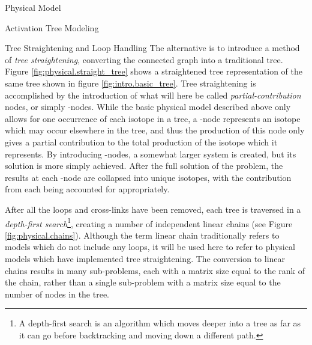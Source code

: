 \begin{chapter}{Physical Model\label{chap:physical}}
\begin{section}{Activation Tree Modeling\label{sec:physical.chains}}
\begin{subsection}{Tree Straightening and Loop Handling}
    The alternative is to introduce a method of \textsl{tree
      straightening}, converting the connected graph into a
    traditional \nary tree.  Figure \ref{fig:physical.straight_tree}
    shows a straightened tree representation of the same tree shown in
    figure \ref{fig:intro.basic_tree}.  Tree straightening is
    accomplished by the introduction of what will here be called
    \textsl{partial-contribution} nodes, or simply \pc-nodes.  While
    the basic physical model described above only allows for one
    occurrence of each isotope in a tree, a \pc-node represents an
    isotope which may occur elsewhere in the tree, and thus the
    production of this node only gives a partial contribution to the
    total production of the isotope which it represents.  By
    introducing \pc-nodes, a somewhat larger system is created, but
    its solution is more simply achieved.  After the full solution of
    the problem, the results at each \pc-node are collapsed into
    unique isotopes, with the contribution from each being accounted
    for appropriately.

    After all the loops and cross-links have been removed, each tree
    is traversed in a \textsl{depth-first search}\footnote{A
      depth-first search is an algorithm which moves deeper into a
      tree as far as it can go before backtracking and moving down a
      different path.}, creating a number of independent linear chains
    (see Figure \ref{fig:physical.chains}).  Although the term linear
    chain traditionally refers to models which do not include any
    loops, it will be used here to refer to physical models which have
    implemented tree straightening.  The conversion to linear chains
    results in many sub-problems, each with a matrix size equal to the
    rank of the chain, rather than a single sub-problem with a matrix
    size equal to the number of nodes in the tree.
    
    \begin{floatingfigure}{0.55\columnwidth}
      \begin{center}
        \caption{Separated linear chain representation of activation tree.}\label{fig:physical.chains}
      \end{center}
    \end{floatingfigure}


\end{subsection}
\end{section}
\end{chapter}

